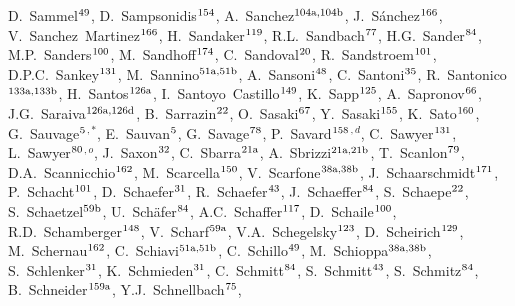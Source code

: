 \begin{flushleft}
D.~Sammel$^\textrm{\scriptsize 49}$,
D.~Sampsonidis$^\textrm{\scriptsize 154}$,
A.~Sanchez$^\textrm{\scriptsize 104a,104b}$,
J.~S\'anchez$^\textrm{\scriptsize 166}$,
V.~Sanchez~Martinez$^\textrm{\scriptsize 166}$,
H.~Sandaker$^\textrm{\scriptsize 119}$,
R.L.~Sandbach$^\textrm{\scriptsize 77}$,
H.G.~Sander$^\textrm{\scriptsize 84}$,
M.P.~Sanders$^\textrm{\scriptsize 100}$,
M.~Sandhoff$^\textrm{\scriptsize 174}$,
C.~Sandoval$^\textrm{\scriptsize 20}$,
R.~Sandstroem$^\textrm{\scriptsize 101}$,
D.P.C.~Sankey$^\textrm{\scriptsize 131}$,
M.~Sannino$^\textrm{\scriptsize 51a,51b}$,
A.~Sansoni$^\textrm{\scriptsize 48}$,
C.~Santoni$^\textrm{\scriptsize 35}$,
R.~Santonico$^\textrm{\scriptsize 133a,133b}$,
H.~Santos$^\textrm{\scriptsize 126a}$,
I.~Santoyo~Castillo$^\textrm{\scriptsize 149}$,
K.~Sapp$^\textrm{\scriptsize 125}$,
A.~Sapronov$^\textrm{\scriptsize 66}$,
J.G.~Saraiva$^\textrm{\scriptsize 126a,126d}$,
B.~Sarrazin$^\textrm{\scriptsize 22}$,
O.~Sasaki$^\textrm{\scriptsize 67}$,
Y.~Sasaki$^\textrm{\scriptsize 155}$,
K.~Sato$^\textrm{\scriptsize 160}$,
G.~Sauvage$^\textrm{\scriptsize 5}$$^{,*}$,
E.~Sauvan$^\textrm{\scriptsize 5}$,
G.~Savage$^\textrm{\scriptsize 78}$,
P.~Savard$^\textrm{\scriptsize 158}$$^{,d}$,
C.~Sawyer$^\textrm{\scriptsize 131}$,
L.~Sawyer$^\textrm{\scriptsize 80}$$^{,o}$,
J.~Saxon$^\textrm{\scriptsize 32}$,
C.~Sbarra$^\textrm{\scriptsize 21a}$,
A.~Sbrizzi$^\textrm{\scriptsize 21a,21b}$,
T.~Scanlon$^\textrm{\scriptsize 79}$,
D.A.~Scannicchio$^\textrm{\scriptsize 162}$,
M.~Scarcella$^\textrm{\scriptsize 150}$,
V.~Scarfone$^\textrm{\scriptsize 38a,38b}$,
J.~Schaarschmidt$^\textrm{\scriptsize 171}$,
P.~Schacht$^\textrm{\scriptsize 101}$,
D.~Schaefer$^\textrm{\scriptsize 31}$,
R.~Schaefer$^\textrm{\scriptsize 43}$,
J.~Schaeffer$^\textrm{\scriptsize 84}$,
S.~Schaepe$^\textrm{\scriptsize 22}$,
S.~Schaetzel$^\textrm{\scriptsize 59b}$,
U.~Sch\"afer$^\textrm{\scriptsize 84}$,
A.C.~Schaffer$^\textrm{\scriptsize 117}$,
D.~Schaile$^\textrm{\scriptsize 100}$,
R.D.~Schamberger$^\textrm{\scriptsize 148}$,
V.~Scharf$^\textrm{\scriptsize 59a}$,
V.A.~Schegelsky$^\textrm{\scriptsize 123}$,
D.~Scheirich$^\textrm{\scriptsize 129}$,
M.~Schernau$^\textrm{\scriptsize 162}$,
C.~Schiavi$^\textrm{\scriptsize 51a,51b}$,
C.~Schillo$^\textrm{\scriptsize 49}$,
M.~Schioppa$^\textrm{\scriptsize 38a,38b}$,
S.~Schlenker$^\textrm{\scriptsize 31}$,
K.~Schmieden$^\textrm{\scriptsize 31}$,
C.~Schmitt$^\textrm{\scriptsize 84}$,
S.~Schmitt$^\textrm{\scriptsize 43}$,
S.~Schmitz$^\textrm{\scriptsize 84}$,
B.~Schneider$^\textrm{\scriptsize 159a}$,
Y.J.~Schnellbach$^\textrm{\scriptsize 75}$,
$$
\end{flushleft}
